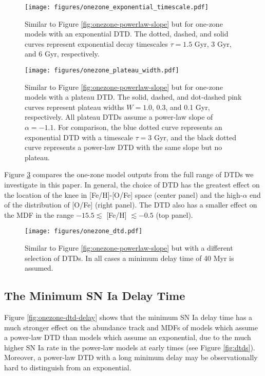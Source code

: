 \documentclass[twocolumn,linenumbers,twocolappendix]{aastex631}
\begin{document}
\begin{figure}
    \centering
    \texttt{[image: figures/onezone\_exponential\_timescale.pdf]}
    \caption{Similar to Figure \ref{fig:onezone-powerlaw-slope} but for one-zone models with an exponential DTD. The dotted, dashed, and solid curves represent exponential decay timescales $\tau=1.5$ Gyr, 3 Gyr, and 6 Gyr, respectively.}
    \label{fig:onezone-exponential-timescale}
\end{figure}

\begin{figure}
    \centering
    \texttt{[image: figures/onezone\_plateau\_width.pdf]}
    \caption{Similar to Figure \ref{fig:onezone-powerlaw-slope} but for one-zone models with a plateau DTD. The solid, dashed, and dot-dashed pink curves represent plateau widths $W=1.0$, 0.3, and 0.1 Gyr, respectively. All plateau DTDs assume a power-law slope of $\alpha=-1.1$. For comparison, the blue dotted curve represents an exponential DTD with a timescale $\tau=3$ Gyr, and the black dotted curve represents a power-law DTD with the same slope but no plateau.}
    \label{fig:onezone-plateau-width}
\end{figure}

Figure \ref{fig:onezone-dtd} compares the one-zone model outputs from the full range of DTDs we investigate in this paper. In general, the choice of DTD has the greatest effect on the location of the knee in [Fe/H]-[O/Fe] space (center panel) and the high-$\alpha$ end of the distribution of [O/Fe] (right panel). The DTD also has a smaller effect on the MDF in the range $-15.5\lesssim$ [Fe/H] $\lesssim-0.5$ (top panel).

\begin{figure}
    \centering
    \texttt{[image: figures/onezone\_dtd.pdf]}
    \caption{Similar to Figure \ref{fig:onezone-powerlaw-slope} but with a different selection of DTDs. In all cases a minimum delay time of 40 Myr is assumed.}
    \label{fig:onezone-dtd}
\end{figure}

\subsection{The Minimum SN Ia Delay Time}

Figure \ref{fig:onezone-dtd-delay} shows that the minimum SN Ia delay time has a much stronger effect on the abundance track and MDFs of models which assume a power-law DTD than models which assume an exponential, due to the much higher SN Ia rate in the power-law models at early times (see Figure \ref{fig:dtds}). Moreover, a power-law DTD with a long minimum delay may be observationally hard to distinguish from an exponential. 
\end{document}
